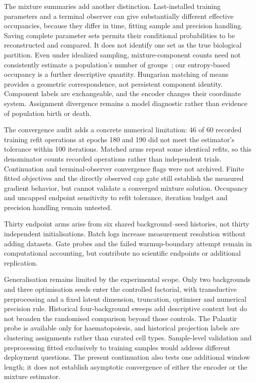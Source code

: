 \documentclass[11pt]{article}
\begin{document}
The mixture summaries add another distinction. Last-installed training parameters and a terminal observer can give substantially different effective occupancies, because they differ in time, fitting sample and precision handling. Saving complete parameter sets permits their conditional probabilities to be reconstructed and compared. It does not identify one set as the true biological partition. Even under idealized sampling, mixture-component counts need not consistently estimate a population's number of groups~\cite{miller2014inconsistency}; our entropy-based occupancy is a further descriptive quantity. Hungarian matching of means provides a geometric correspondence, not persistent component identity. Component labels are exchangeable, and the encoder changes their coordinate system. Assignment divergence remains a model diagnostic rather than evidence of population birth or death.

The convergence audit adds a concrete numerical limitation: 46 of 60 recorded training refit operations at epochs 180 and 190 did not meet the estimator's tolerance within 100 iterations. Matched arms repeat some identical refits, so this denominator counts recorded operations rather than independent trials. Continuation and terminal-observer convergence flags were not archived. Finite fitted objectives and the directly observed cap gate still establish the measured gradient behavior, but cannot validate a converged mixture solution. Occupancy and uncapped endpoint sensitivity to refit tolerance, iteration budget and precision handling remain untested.

Thirty endpoint arms arise from six shared background--seed histories, not thirty independent initialisations. Batch logs increase measurement resolution without adding datasets. Gate probes and the failed warmup-boundary attempt remain in computational accounting, but contribute no scientific endpoints or additional replication.

Generalisation remains limited by the experimental scope. Only two backgrounds and three optimisation seeds enter the controlled factorial, with transductive preprocessing and a fixed latent dimension, truncation, optimiser and numerical precision rule. Historical four-background sweeps add descriptive context but do not broaden the randomised comparison beyond those controls. The Palantir probe is available only for haematopoiesis, and historical projection labels are clustering assignments rather than curated cell types. Sample-level validation and preprocessing fitted exclusively to training samples would address different deployment questions. The present continuation also tests one additional window length; it does not establish asymptotic convergence of either the encoder or the mixture estimator.
\end{document}
